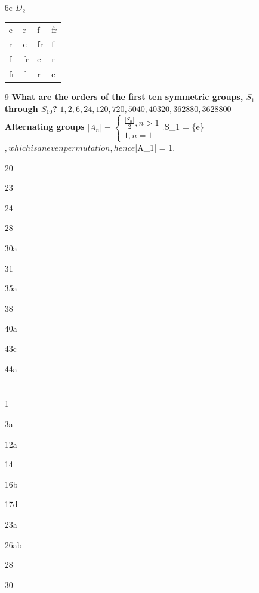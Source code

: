 \documentclass[12pt]{article}
\begin{document}
\section{}
\begin{enumerate}
\item[6c] $D_2$\\
   \begin{center}
    \begin{tabular}{llll}
      e & r & f & fr\\
      r & e & fr & f\\
      f & fr & e & r\\
      fr & f & r & e\\
    \end{tabular}
  \end{center}
\item[9] {\bf What are the orders of the first ten symmetric groups, $S_1$ through $S_{10}$?}
  $1, 2, 6, 24, 120, 720, 5040, 40320, 362880, 3628800$\\
  {\bf Alternating groups}
  $|A_n| =
  \begin{cases}
    \frac{|S_n|}{2}, n > 1\\
    1, n = 1
  \end{cases}.
  $S_1 = \{e\}$, which is an even permutation, hence $|A_1| = 1$.
$

\item[20]
\item[23]
\item[24]
\item[28]
\item[30a]
\item[31]
\item[35a]
\item[38]
\item[40a]
\item[43c]
\item[44a]
\end{enumerate}


\section{}
\begin{enumerate}
\item[1]
\item[3a]
\item[12a]
\item[14]
\item[16b]
\item[17d]
\item[23a]
\item[26ab]
\item[28]
\item[30]
\end{enumerate}
\end{document}
